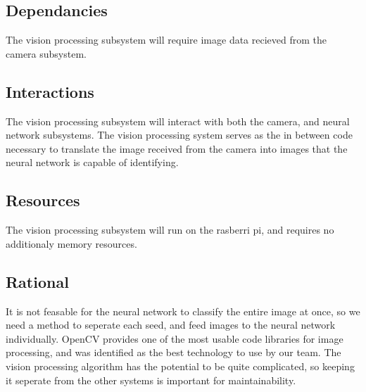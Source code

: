 \subsection{Dependancies} 

The vision processing subsystem will require image data recieved from the camera subsystem.

\subsection{Interactions}

The vision processing subsystem will interact with both the camera, and neural network subsystems. 
The vision processing system serves as the in between code necessary to translate the image received from the camera
into images that the neural network is capable of identifying.

\subsection{Resources} 

The vision processing subsystem will run on the rasberri pi, 
and requires no additionaly memory resources.

\subsection{Rational}

It is not feasable for the neural network to classify the entire image at once, so we need a method to seperate each seed, and feed images to the neural network individually. 
OpenCV provides one of the most usable code libraries for image processing, and was identified as the best technology to use by our team.
The vision processing algorithm has the potential to be quite complicated, so keeping it seperate from the other systems is important for maintainability.
 



